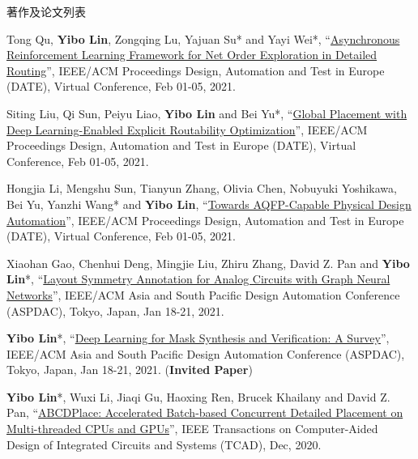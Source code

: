 \begin{rSection}{著作及论文列表}
\begin{description}[font=\normalfont, rightmargin=2em]
{}
            

\item[{[C68]}]{
        Tong Qu, \textbf{Yibo Lin}, Zongqing Lu, Yajuan Su* and Yayi Wei*, 
    ``\href{https://doi.org/10.23919/DATE51398.2021.9474007}{Asynchronous Reinforcement Learning Framework for Net Order Exploration in Detailed Routing}'', 
    IEEE/ACM Proceedings Design, Automation and Test in Europe (DATE), Virtual Conference, Feb 01-05, 2021.
    
}
            

\item[{[C67]}]{
        Siting Liu, Qi Sun, Peiyu Liao, \textbf{Yibo Lin} and Bei Yu*, 
    ``\href{https://doi.org/10.23919/DATE51398.2021.9473959}{Global Placement with Deep Learning-Enabled Explicit Routability Optimization}'', 
    IEEE/ACM Proceedings Design, Automation and Test in Europe (DATE), Virtual Conference, Feb 01-05, 2021.
    
}
            

\item[{[C66]}]{
        Hongjia Li, Mengshu Sun, Tianyun Zhang, Olivia Chen, Nobuyuki Yoshikawa, Bei Yu, Yanzhi Wang* and \textbf{Yibo Lin}, 
    ``\href{https://doi.org/10.23919/DATE51398.2021.9474259}{Towards AQFP-Capable Physical Design Automation}'', 
    IEEE/ACM Proceedings Design, Automation and Test in Europe (DATE), Virtual Conference, Feb 01-05, 2021.
    
}
            

\item[{[C65]}]{
        Xiaohan Gao, Chenhui Deng, Mingjie Liu, Zhiru Zhang, David Z. Pan and \textbf{Yibo Lin}*, 
    ``\href{https://doi.org/10.1145/3394885.3431545}{Layout Symmetry Annotation for Analog Circuits with Graph Neural Networks}'', 
    IEEE/ACM Asia and South Pacific Design Automation Conference (ASPDAC), Tokyo, Japan, Jan 18-21, 2021.
    
}
            

\item[{[C64]}]{
        \textbf{Yibo Lin}*, 
    ``\href{https://doi.org/10.1145/3394885.3431624}{Deep Learning for Mask Synthesis and Verification: A Survey}'', 
    IEEE/ACM Asia and South Pacific Design Automation Conference (ASPDAC), Tokyo, Japan, Jan 18-21, 2021.
    (\textbf{Invited Paper})
}
            

\item[{[J63]}]{
        \textbf{Yibo Lin}*, Wuxi Li, Jiaqi Gu, Haoxing Ren, Brucek Khailany and David Z. Pan, 
    ``\href{https://doi.org/10.1109/TCAD.2020.2971531}{ABCDPlace: Accelerated Batch-based Concurrent Detailed Placement on Multi-threaded CPUs and GPUs}'', 
    IEEE Transactions on Computer-Aided Design of Integrated Circuits and Systems (TCAD), Dec, 2020.
    
}
\end{description}
\end{rSection}
